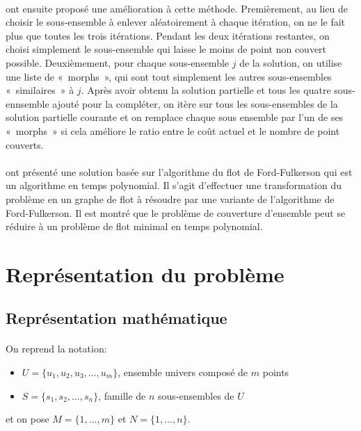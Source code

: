 \documentclass[12pt,letterpaper,twoside]{article}
\begin{document}
				\paragraph*{}
					\citeauthor{Brusco1999} ont ensuite proposé une amélioration à cette méthode.
					Premièrement, au lieu de choisir le sous-ensemble à enlever aléatoirement à chaque itération, on ne le fait plus
					que toutes les trois itérations. Pendant les deux itérations restantes, on choisi simplement le sous-ensemble qui
					laisse le moins de point non couvert possible. Deuxièmement, pour chaque sous-ensemble \(j\) de la solution,
					on utilise une liste de « morphs », qui sont tout simplement les autres sous-ensembles « similaires » à \(j\).
					Après avoir obtenu la solution partielle et tous les quatre sous-ennsemble ajouté pour la compléter, on itère
					sur tous les sous-ensembles de la solution partielle courante
					et on remplace chaque sous ensemble par l'un de ses « morphs » si cela améliore le ratio entre le coût actuel
					et le nombre de point couverts.~\cite{Brusco1999}
				\paragraph*{}
					\citeauthor{Afif1995} ont présenté une solution basée sur l'algorithme du flot de Ford-Fulkerson qui est un algorithme
					en temps polynomial.
					Il s'agit d'effectuer une transformation du problème en un graphe de flot à résoudre par une variante de l'algorithme
					de Ford-Fulkerson. Il est montré que le problème de couverture d'ensemble peut se réduire à un problème de flot minimal
					en temps polynomial.~\cite{Afif1995}
	\section{Représentation du problème}
		\subsection{Représentation mathématique}
			\paragraph*{}
				On reprend la notation:
				\begin{itemize}
					\item \(U = \{u_1, u_2, u_3, \dots, u_m\}\), ensemble univers composé de \(m\) points
					\item \(S = \{s_1, s_2, \dots, s_n\}\), famille de \(n\) sous-ensembles de \(U\)
				\end{itemize}
				et on pose \(M = \{1,\ldots,m\}\) et \(N = \{1,\ldots,n\}\).
\end{document}
